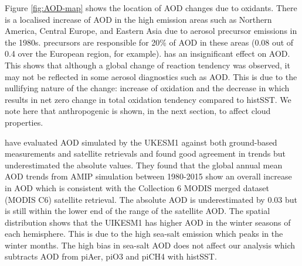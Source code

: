 Figure \ref{fig:AOD-map} shows the location of AOD changes due to oxidants. There is a localised increase of AOD in the high emission areas such as Northern America, Central Europe, and Eastern Asia due to aerosol precursor emissions in the 1980s.  precursors are responsible for 20\% of AOD in these areas (0.08 out of 0.4 over the European region, for example).  has an insignificant effect on AOD. This shows that although a global change of reaction tendency was observed, it may not be reflected in some aerosol diagnostics such as AOD. This is due to the nullifying nature of the change: increase of  oxidation and the decrease in  which results in net zero change in total oxidation tendency compared to histSST. We note here that anthropogenic  is shown, in the next section, to affect cloud properties.

\citet{mulcahyDescriptionEvaluationAerosol2020} have evaluated AOD simulated by the UKESM1 against both ground-based measurements and satellite retrievals and found good agreement in trends but underestimated the absolute values. They found that the global annual mean AOD trends from AMIP simulation between 1980-2015 show an overall increase in AOD which is consistent with the Collection 6 MODIS merged dataset (MODIS C6) satellite retrieval. The absolute AOD is underestimated by 0.03 but is still within the lower end of the range of the satellite AOD. The spatial distribution shows that the UIKESM1 has higher AOD in the winter seasons of each hemisphere. This is due to the high sea-salt emission which peaks in the winter months. The high bias in sea-salt AOD does not affect our analysis which subtracts AOD from piAer, piO3 and piCH4 with histSST.

